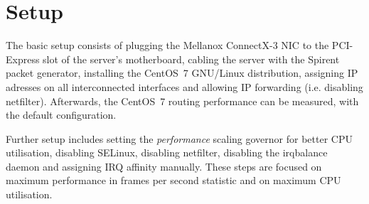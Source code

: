 
\chapter{Setup}\label{chap:setup}
The basic setup consists of plugging the Mellanox ConnectX-3 NIC to the PCI-Express slot of the server's motherboard,
cabling the server with the Spirent packet generator,
installing the CentOS~7 GNU/Linux distribution, assigning IP adresses on all interconnected interfaces
and allowing IP forwarding (i.e. disabling netfilter).
Afterwards, the CentOS~7 routing performance can be measured, with the default configuration.

Further setup includes setting the {\it{performance}} scaling governor for better CPU utilisation,
disabling SELinux, disabling netfilter,
disabling the irqbalance daemon and assigning IRQ affinity manually.
These steps are focused on maximum performance in frames per second statistic
and on maximum CPU utilisation.








